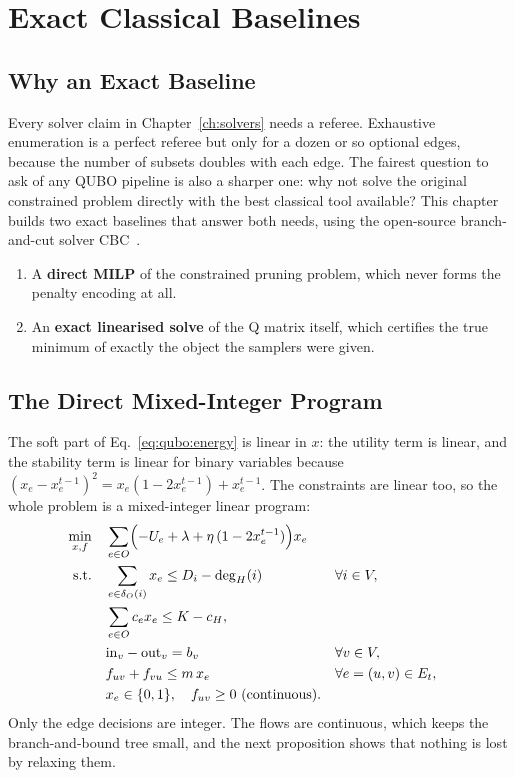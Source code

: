 \chapter{Exact Classical Baselines}
\label{ch:exact}

\section{Why an Exact Baseline}

Every solver claim in Chapter~\ref{ch:solvers} needs a referee. Exhaustive
enumeration is a perfect referee but only for a dozen or so optional edges,
because the number of subsets doubles with each edge. The fairest question
to ask of any QUBO pipeline is also a sharper one: why not solve the original
constrained problem directly with the best classical tool available? This
chapter builds two exact baselines that answer both needs, using the
open-source branch-and-cut solver CBC~\cite{cbc}.

\begin{enumerate}[label=\arabic*.]
\item A \textbf{direct MILP} of the constrained pruning problem, which never
forms the penalty encoding at all.
\item An \textbf{exact linearised solve} of the Q matrix itself, which
certifies the true minimum of exactly the object the samplers were given.
\end{enumerate}

\section{The Direct Mixed-Integer Program}

The soft part of Eq.~\eqref{eq:qubo:energy} is linear in $x$: the utility
term is linear, and the stability term is linear for binary variables because
$(x_e-x_e^{t-1})^2=x_e(1-2x_e^{t-1})+x_e^{t-1}$. The constraints are linear
too, so the whole problem is a mixed-integer linear program:
\begin{align}
\min_{x,f}\quad & \sum_{e\in O}\Bigl(-U_e+\lambda+\eta\,(1-2x_e^{t-1})\Bigr)x_e
\label{eq:exact:obj}\\
\text{s.t.}\quad & \sum_{e\in\delta_O(i)}x_e\le D_i-\deg_H(i) && \forall i\in V,\\
& \sum_{e\in O}c_ex_e\le K-c_H, \\
& \mathrm{in}_v-\mathrm{out}_v=b_v && \forall v\in V,\\
& f_{uv}+f_{vu}\le m\,x_e && \forall e=(u,v)\in E_t,\\
& x_e\in\{0,1\},\quad f_{uv}\ge0\ \text{(continuous)}. \notag
\end{align}
Only the edge decisions are integer. The flows are continuous, which keeps the
branch-and-bound tree small, and the next proposition shows that nothing is
lost by relaxing them.

